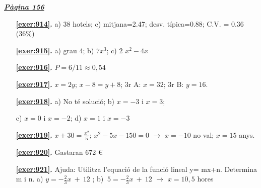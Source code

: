 
\hyperlink{page.156}{\textbf{\em Pàgina 156}}
\begin{enumerate}
\item[\fontfamily{phv}\selectfont\color{blue}\textbf{\ref{exer:914}. }] \label{ans:914} 
 a) 38 hotels; c) mitjana=2.47; desv. típica=0.88; C.V. = 0.36 (36\%)
 \end{enumerate}
\begin{enumerate}
\item[\fontfamily{phv}\selectfont\color{blue}\textbf{\ref{exer:915}. }] \label{ans:915} 
 a) grau 4; \quad b) $7x^{3}$; \quad c) 2 $x^{2}-4x$
\item[\fontfamily{phv}\selectfont\color{blue}\textbf{\ref{exer:916}. }] \label{ans:916} 
 $P=6/11 \approx 0,54$
\item[\fontfamily{phv}\selectfont\color{blue}\textbf{\ref{exer:917}. }] \label{ans:917} 
 $x=2y$; $x -8 = y+8$; \quad 3r A: $x= 32$; \quad 3r B: $y=16$.
\item[\fontfamily{phv}\selectfont\color{blue}\textbf{\ref{exer:918}. }] \label{ans:918} 
 a) No té solució; \quad b) $x=-3$ i $x=3$; \par c) $x=0$ i $x=-2$; \quad d) $x=1$ i $x=-3$
\item[\fontfamily{phv}\selectfont\color{blue}\textbf{\ref{exer:919}. }] \label{ans:919} 
 $x+30=\frac {x^2}{5}$; $x^2-5x-150=0$ $\rightarrow $ $x=-10$ no val; $x=15$ anys.
\item[\fontfamily{phv}\selectfont\color{blue}\textbf{\ref{exer:920}. }] \label{ans:920} 
 Gastaran 672 \euro {} 
\item[\fontfamily{phv}\selectfont\color{blue}\textbf{\ref{exer:921}. }] \label{ans:921} 
Ajuda: Utilitza l'equació de la funció lineal y= mx+n. Determina m i n. a) $y=-\frac {2}{3}x\ +\ 12$ ; \quad b) $\ 5=-\frac {2}{3}x\ +\ 12$ $\rightarrow $ $x=10,5$ hores
 \end{enumerate}
\vspace{0.3cm}


